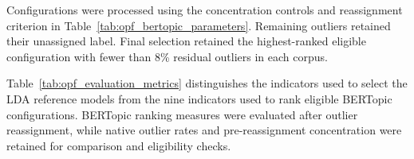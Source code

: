 \documentclass[a4paper,fleqn]{cas-sc}
\begin{document}
    
    Configurations were processed using the concentration controls and reassignment criterion in Table~\ref{tab:opf_bertopic_parameters}. Remaining outliers retained their unassigned label. Final selection retained the highest-ranked eligible configuration with fewer than 8\% residual outliers in each corpus.
    
    Table~\ref{tab:opf_evaluation_metrics} distinguishes the indicators used to select the LDA reference models from the nine indicators used to rank eligible BERTopic configurations. BERTopic ranking measures were evaluated after outlier reassignment, while native outlier rates and pre-reassignment concentration were retained for comparison and eligibility checks.
    
\end{document}
